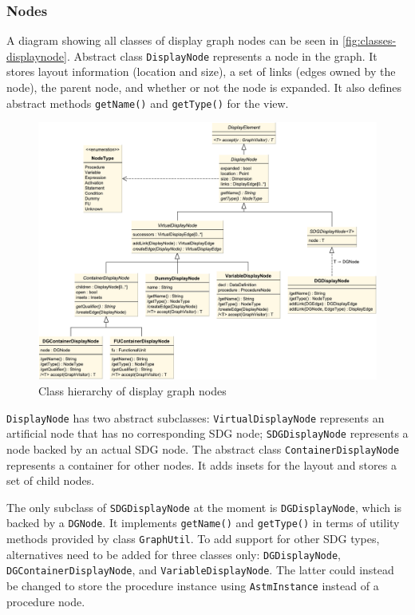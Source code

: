 \subsubsection{Nodes}

A diagram showing all classes of display graph nodes can be seen in \autoref{fig:classes-displaynode}. Abstract class 
\lstinline|DisplayNode| represents a node in the graph. It stores layout information (location and size), a set of 
links (edges owned by the node), the parent node, and whether or not the node is expanded. It also defines abstract 
methods \lstinline|getName()| and \lstinline|getType()| for the view.

\begin{figure}
  \centering
    \includegraphics[scale=0.5]{bilder/classes-displaynode}
  \caption{Class hierarchy of display graph nodes}
  \label{fig:classes-displaynode}
\end{figure}

\lstinline|DisplayNode| has two abstract subclasses: \lstinline|VirtualDisplayNode| represents an artificial node that 
has no corresponding SDG node; \lstinline|SDGDisplayNode| represents a node backed by an actual SDG node. The abstract 
class \lstinline|ContainerDisplayNode| represents a container for other nodes. It adds insets for the layout and stores 
a set of child nodes.

The only subclass of \lstinline|SDGDisplayNode| at the moment is \lstinline|DGDisplayNode|, which is backed by a 
\lstinline|DGNode|. It implements \lstinline|getName()| and \lstinline|getType()| in terms of utility methods provided 
by class \lstinline|GraphUtil|. To add support for other SDG types, alternatives need to be added for three classes 
only: \lstinline|DGDisplayNode|, \lstinline|DGContainerDisplayNode|, and \lstinline|VariableDisplayNode|. The latter 
could instead be changed to store the procedure instance using \lstinline|AstmInstance| instead of a procedure node.

